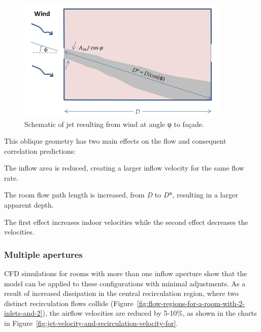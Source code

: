 {\begin{figure}[hbtp] %
\centering
\includegraphics[width=0.9\textwidth, height=0.9\textheight, keepaspectratio=true]{media/image2659.png}
\caption{Schematic of jet resulting from wind at angle φ to façade. \protect \label{fig:schematic-of-jet-resulting-from-wind-at-angle}}
\end{figure}

This oblique geometry has two main effects on the flow and consequent correlation predictions:

The inflow area is reduced, creating a larger inflow velocity for the same flow rate.

The room flow path length is increased, from \emph{D} to \emph{D}*, resulting in a larger apparent depth.

The first effect increases indoor velocities while the second effect decreases the velocities.

\subsubsection{Multiple apertures}\label{multiple-apertures}

CFD simulations for rooms with more than one inflow aperture show that the model can be applied to these configurations with minimal adjustments. As a result of increased dissipation in the central recirculation region, where two distinct recirculation flows collide (Figure~\ref{fig:flow-regions-for-a-room-with-2-inlets-and-2}), the airflow velocities are reduced by 5-10\%, as shown in the charts in Figure~\ref{fig:jet-velocity-and-recirculation-velocity-for}.

}
